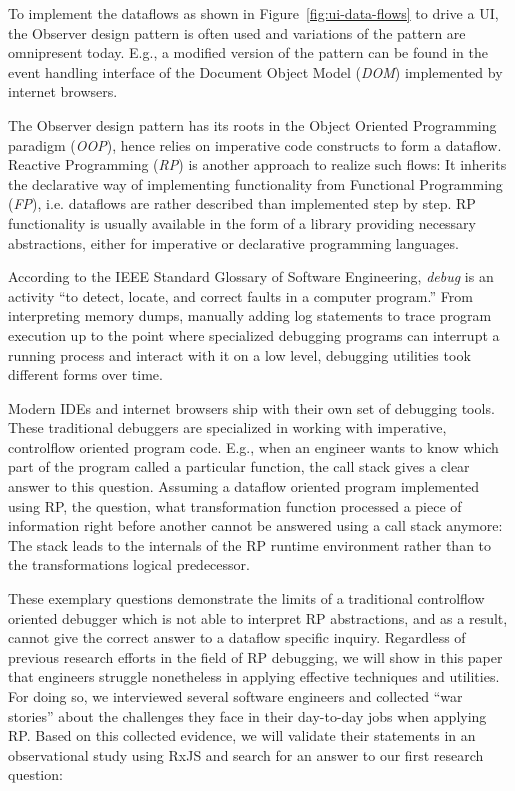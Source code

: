 \documentclass[12pt,a4paper]{article}
\begin{document}
To implement the dataflows as shown in Figure~\ref{fig:ui-data-flows} to drive a UI, the Observer design pattern\cite{gamma1995design} is often used and variations of the pattern are omnipresent today. E.g., a modified version of the pattern can be found in the event handling interface of the Document Object Model (\emph{DOM})\cite{alabor:2019:reactiveappllications} implemented by internet browsers.

The Observer design pattern has its roots in the Object Oriented Programming paradigm (\emph{OOP}), hence relies on imperative code constructs to form a dataflow. Reactive Programming (\emph{RP}) is another approach to realize such flows: It inherits the declarative way of implementing functionality from Functional Programming (\emph{FP}), i.e. dataflows are rather described than implemented step by step\cite{10.1145/2501654.2501666}. RP functionality is usually available in the form of a library providing necessary abstractions, either for imperative or declarative programming languages.

According to the IEEE Standard Glossary of Software Engineering, \emph{debug} is an activity ``to detect, locate, and correct faults in a computer program.''\cite{ieeeglossary} From interpreting memory dumps, manually adding log statements to trace program execution up to the point where specialized debugging programs can interrupt a running process and interact with it on a low level, debugging utilities took different forms over time.

Modern IDEs and internet browsers ship with their own set of debugging tools. These traditional debuggers are specialized in working with imperative, controlflow oriented program code. E.g., when an engineer wants to know which part of the program called a particular function, the call stack gives a clear answer to this question. Assuming a dataflow oriented program implemented using RP, the question, what transformation function processed a piece of information right before another cannot be answered using a call stack anymore: The stack leads to the internals of the RP runtime environment rather than to the transformations logical predecessor.

These exemplary questions demonstrate the limits of a traditional controlflow oriented debugger which is not able to interpret RP abstractions, and as a result, cannot give the correct answer to a dataflow specific inquiry. Regardless of previous research efforts \cite{10.1145/2577080.2577083} \cite{10.1145/2884781.2884815} \cite{10.1145/3180155.3180156} in the field of RP debugging, we will show in this paper that engineers struggle nonetheless in applying effective techniques and utilities. For doing so, we interviewed several software engineers and collected ``war stories'' about the challenges they face in their day-to-day jobs when applying RP. Based on this collected evidence, we will validate their statements in an observational study using RxJS and search for an answer to our first research question:
\end{document}
